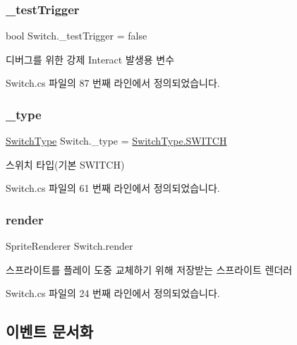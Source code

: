 \subsubsection{\texorpdfstring{\_testTrigger}{\_testTrigger}}
{\footnotesize\ttfamily bool Switch.\+\_\+test\+Trigger = false}



디버그를 위한 강제 Interact 발생용 변수 



Switch.\+cs 파일의 87 번째 라인에서 정의되었습니다.

\mbox{\label{class_switch_a8e2af94ed2134ec3d42860bcbf60de66}} 
\subsubsection{\texorpdfstring{\_type}{\_type}}
{\footnotesize\ttfamily \mbox{\hyperlink{class_switch_aa3d83cf921138e9b74aa9a28f1970a3f}{Switch\+Type}} Switch.\+\_\+type = \mbox{\hyperlink{class_switch_aa3d83cf921138e9b74aa9a28f1970a3fa4239f063a3d4fb9d38a0182be6e39e76}{Switch\+Type.\+S\+W\+I\+T\+CH}}}



스위치 타입(기본 S\+W\+I\+T\+CH) 



Switch.\+cs 파일의 61 번째 라인에서 정의되었습니다.

\mbox{\label{class_switch_a91fdd02a949dd741f026a21104ab50dc}} 
\subsubsection{\texorpdfstring{render}{render}}
{\footnotesize\ttfamily Sprite\+Renderer Switch.\+render\hspace{0.3cm}{\ttfamily [private]}}



스프라이트를 플레이 도중 교체하기 위해 저장받는 스프라이트 렌더러 



Switch.\+cs 파일의 24 번째 라인에서 정의되었습니다.



\subsection{이벤트 문서화}
\mbox{\label{class_interactable_object_afe5e0b16d86c2ed4abf4a71a1995f7ae}} 
